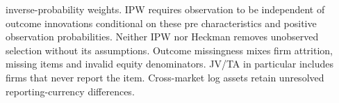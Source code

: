 \begin{minipage}{\linewidth}
inverse-probability weights. IPW requires observation to be independent of outcome innovations conditional on these pre characteristics and positive observation probabilities. Neither IPW nor Heckman removes unobserved selection without its assumptions. Outcome missingness mixes firm attrition, missing items and invalid equity denominators. JV/TA in particular includes firms that never report the item. Cross-market log assets retain unresolved reporting-currency differences.
\end{minipage}
